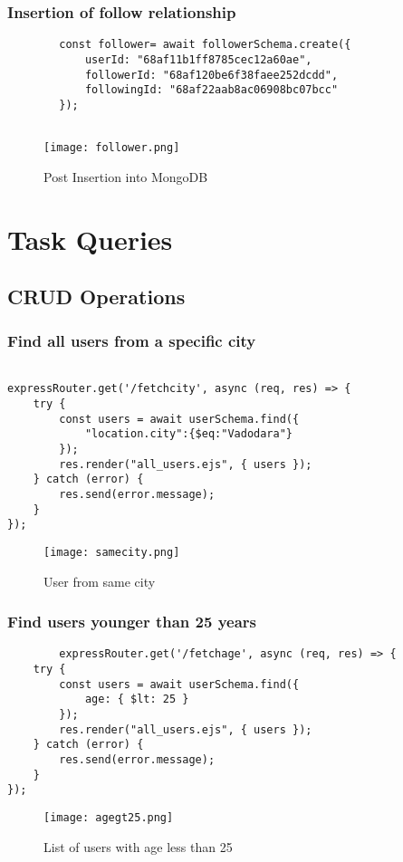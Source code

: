 \documentclass[12pt,a4paper]{article}
\begin{document}
\subsubsection{Insertion of follow relationship}
\begin{lstlisting}
        const follower= await followerSchema.create({
            userId: "68af11b1ff8785cec12a60ae",
            followerId: "68af120be6f38faee252dcdd",
            followingId: "68af22aab8ac06908bc07bcc"
        });
        
\end{lstlisting}


\begin{figure}[H]
    \centering
    \texttt{[image: follower.png]}
    \caption{Post Insertion into MongoDB}
    \label{fig:sample}
\end{figure}


\section{Task Queries}
\subsection{CRUD Operations}

\subsubsection{Find all users from a specific city}
    \begin{lstlisting}
    
expressRouter.get('/fetchcity', async (req, res) => {
    try {
        const users = await userSchema.find({
            "location.city":{$eq:"Vadodara"}
        });
        res.render("all_users.ejs", { users });
    } catch (error) {
        res.send(error.message);
    }
});
    \end{lstlisting}
    

\begin{figure}[h]
    \centering
    \texttt{[image: samecity.png]}
    \caption{User from same city}
    \label{fig:sample}
\end{figure}

\subsubsection{Find users younger than 25 years}
    \begin{lstlisting}
        expressRouter.get('/fetchage', async (req, res) => {
    try {
        const users = await userSchema.find({
            age: { $lt: 25 }
        });
        res.render("all_users.ejs", { users });
    } catch (error) {
        res.send(error.message);
    }
});
    \end{lstlisting}
    \begin{figure}[H]
    \centering
    \texttt{[image: agegt25.png]}

    \caption{List of users with age less than 25}
    \label{fig:sample}
\end{figure}
    
\end{document}
